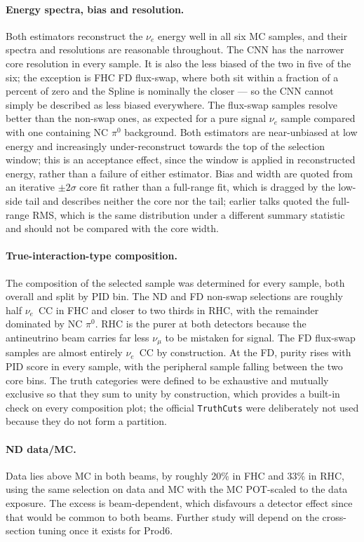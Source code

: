 \documentclass{article}
\begin{document}
\paragraph{Energy spectra, bias and resolution.}
Both estimators reconstruct the $\nu_e$ energy well in all six MC samples, and
their spectra and resolutions are reasonable throughout. The CNN has the narrower
core resolution in every sample. It is also the less biased of the two in five of
the six; the exception is FHC FD flux-swap, where both sit within a fraction of a
percent of zero and the Spline is nominally the closer --- so the CNN cannot
simply be described as less biased everywhere. The flux-swap samples resolve
better than the non-swap ones, as expected for a pure signal $\nu_e$ sample
compared with one containing NC $\pi^0$ background. Both estimators are near-unbiased at low energy and
increasingly under-reconstruct towards the top of the selection window; this is
an acceptance effect, since the window is applied in reconstructed energy, rather
than a failure of either estimator. Bias and width are quoted from an iterative
$\pm2\sigma$ core fit rather than a full-range fit, which is dragged by the
low-side tail and describes neither the core nor the tail; earlier talks quoted
the full-range RMS, which is the same distribution under a different summary
statistic and should not be compared with the core width.

\paragraph{True-interaction-type composition.}
The composition of the selected sample was determined for every sample, both
overall and split by PID bin. The ND and FD non-swap selections are roughly half
$\nu_e$~CC in FHC and closer to two thirds in RHC, with the remainder dominated
by NC $\pi^0$. RHC is the purer at both detectors because the antineutrino beam
carries far less $\nu_\mu$ to be mistaken for signal. The FD flux-swap samples
are almost entirely $\nu_e$~CC by construction. At the FD, purity rises with PID score in every
sample, with the peripheral sample falling between the two core bins. The truth
categories were defined to be exhaustive and mutually exclusive so that they sum
to unity by construction, which provides a built-in check on every composition
plot; the official \texttt{TruthCuts} were deliberately not used because they do
not form a partition.

\paragraph{ND data/MC.}
Data lies above MC in both beams, by roughly 20\% in FHC and 33\% in RHC, using
the same selection on data and MC with the MC POT-scaled to the data exposure.
The excess is beam-dependent, which disfavours a detector effect since that
would be common to both beams. Further study will depend on the cross-section
tuning once it exists for Prod6.
\end{document}
